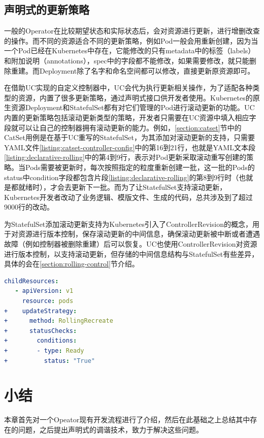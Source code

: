 \documentclass[macfonts,master]{njuthesis}
\begin{document}
\subsection{声明式的更新策略}

一般的Operator在比较期望状态和实际状态后，会对资源进行更新，进行增删改查的操作。而不同的资源适合不同的更新策略，例如Pod一般会用重新创建，因为当一个Pod已经在Kubernetes中存在，它能修改的只有metadata中的标签（labels）和附加说明（annotations），spec中的字段都不能修改，如果需要修改，就只能删除重建。而Deployment除了名字和命名空间都可以修改，直接更新原资源即可。

在借助UC实现的自定义控制器中，UC会代为执行更新相关操作，为了适配各种类型的资源，内置了很多更新策略，通过声明式接口供开发者使用。Kubernetes的原生资源Deployment和StatefulSet都有对它们管理的Pod进行滚动更新的功能。UC内置的更新策略包括滚动更新类型的策略，开发者只需要在UC资源中填入相应字段就可以让自己的控制器拥有滚动更新的能力。例如，\ref{section:catset}节中的CatSet用例是在基于UC重写的StatefulSet，为其添加对滚动更新的支持，只需要YAML文件\ref{listing:catset-controller-config}中的第16到21行，也就是YAML文本段\ref{listing:declarative-rolling}中的第4到9行，表示对Pod更新采取滚动重写创建的策略。当Pods需要被更新时，每次按照指定的粒度重新创建一批，这一批的Pods的status中condition字段都包含片段\ref{listing:declarative-rolling}的第8到9行时（也就是都就绪时），才会去更新下一批。而为了让StatefulSet支持滚动更新，Kubernetes开发者改动了业务逻辑、模版文件、生成的代码，总共涉及到了超过9000行的改动\cite{statefulsetupdate}。

为StatefulSet添加滚动更新支持为Kubernetes引入了ControllerRevision的概念，用于对资源进行版本控制，保存滚动更新的中间信息，确保滚动更新被中断或者遭遇故障（例如控制器被删除重建）后可以恢复。UC也使用ControllerRevision对资源进行版本控制，以支持滚动更新，但存储的中间信息结构与StatefulSet有些差异，具体的会在\ref{section:rolling-control}节介绍。
\begin{lstlisting}[language=yaml,caption=添加滚动更新,label=listing:declarative-rolling]
   childResources:
   - apiVersion: v1
     resource: pods
+    updateStrategy:
+      method: RollingRecreate
+      statusChecks:
+        conditions:
+        - type: Ready
+          status: "True"
\end{lstlisting}

\section{小结}

本章首先对一个Opeator现有开发流程进行了介绍，然后在此基础之上总结其中存在的问题，之后提出声明式的调谐技术，致力于解决这些问题。
\end{document}
